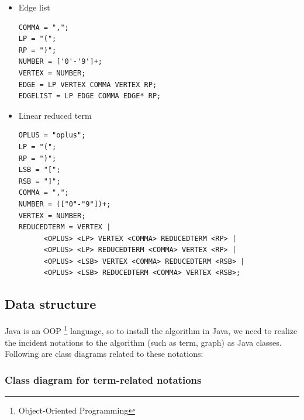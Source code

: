 \documentclass[a4paper, 12pt]{article}
\begin{document}
\begin{itemize}
\item Edge list
\begin{lstlisting}
COMMA = ",";
LP = "(";
RP = ")";
NUMBER = ['0'-'9']+;
VERTEX = NUMBER;
EDGE = LP VERTEX COMMA VERTEX RP;
EDGELIST = LP EDGE COMMA EDGE* RP;
\end{lstlisting}

\item Linear reduced term
\begin{lstlisting}
OPLUS = "oplus";
LP = "(";
RP = ")";
LSB = "[";
RSB = "]";
COMMA = ",";
NUMBER = (["0"-"9"])+;
VERTEX = NUMBER;
REDUCEDTERM = VERTEX |
      <OPLUS> <LP> VERTEX <COMMA> REDUCEDTERM <RP> |
      <OPLUS> <LP> REDUCEDTERM <COMMA> VERTEX <RP> |
      <OPLUS> <LSB> VERTEX <COMMA> REDUCEDTERM <RSB> |
      <OPLUS> <LSB> REDUCEDTERM <COMMA> VERTEX <RSB>;
\end{lstlisting}
 
\end{itemize}

\subsection{Data structure}

Java is an OOP \footnote {Object-Oriented Programming} language, so to install the algorithm in Java, we need
to realize the incident notations to the algorithm (such as term,
graph) as Java classes. Following are class diagrams related to these
notations:

\subsubsection{Class diagram for term-related notations}
\end{document}
